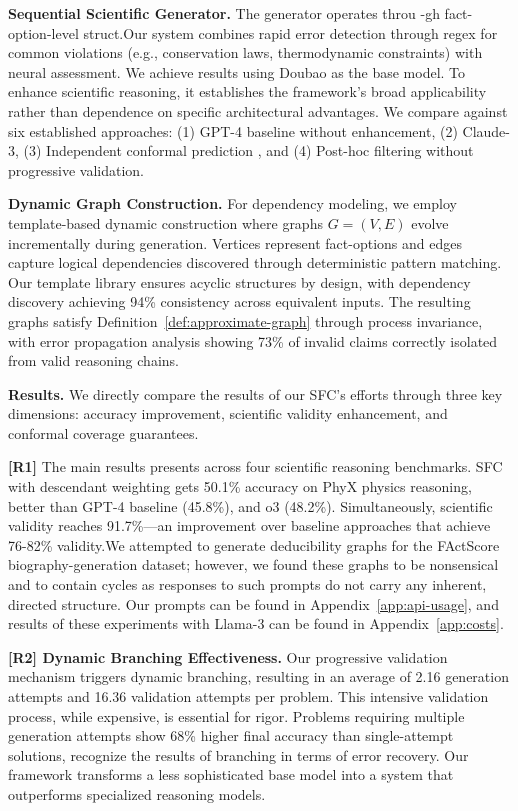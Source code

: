 \documentclass{uai2026} %
\theoremstyle{remark}
\theoremstyle{plain}
\theoremstyle{definition}
\begin{document}
\textbf{Sequential Scientific Generator.} The generator operates throu
-gh fact-option-level struct.Our system combines rapid error detection through regex for common violations (e.g., conservation laws, thermodynamic constraints) with neural assessment. We achieve results using Doubao as the base model. To enhance scientific reasoning, it establishes the framework's broad applicability rather than dependence on specific architectural advantages. We compare against six established approaches: (1) GPT-4 baseline without enhancement, (2)  Claude-3, (3) Independent conformal prediction \cite{mohri2024language}, and (4) Post-hoc filtering without progressive validation. 

\textbf{Dynamic Graph Construction.} For dependency modeling, we employ template-based dynamic construction where graphs $G = (V,E)$ evolve incrementally during generation. Vertices represent fact-options and edges capture logical dependencies discovered through deterministic pattern matching. Our template library ensures acyclic structures by design, with dependency discovery achieving 94\% consistency across equivalent inputs. The resulting graphs satisfy Definition~\ref{def:approximate-graph} through process invariance, with error propagation analysis showing 73\% of invalid claims correctly isolated from valid reasoning chains.

\textbf{Results.} We directly compare the results of our  SFC's efforts through three key dimensions: accuracy improvement, scientific validity enhancement, and conformal coverage guarantees.

\textbf{[R1]} The main results presents across four scientific reasoning benchmarks. SFC with descendant weighting gets 50.1\% accuracy on PhyX physics reasoning, better than GPT-4 baseline (45.8\%), and o3 (48.2\%). Simultaneously, scientific validity reaches 91.7\%—an improvement over baseline approaches that achieve 76-82\% validity.We attempted to generate deducibility graphs for the FActScore biography-generation dataset; however, we found these graphs to be nonsensical and to contain cycles as responses to such prompts do not carry any inherent, directed structure. Our prompts can be found in Appendix~\ref{app:api-usage}, and results of these experiments with Llama-3 can be found in Appendix~\ref{app:costs}.



\textbf{[R2] Dynamic Branching Effectiveness.} Our progressive validation mechanism triggers dynamic branching, resulting in an average of 2.16 generation attempts and 16.36 validation attempts per problem. This intensive validation process, while expensive, is essential for rigor. Problems requiring multiple generation attempts show 68\% higher final accuracy than single-attempt solutions, recognize the results of branching in terms of error recovery. Our framework transforms a less sophisticated base model into a system that outperforms specialized reasoning models.
\end{document}
